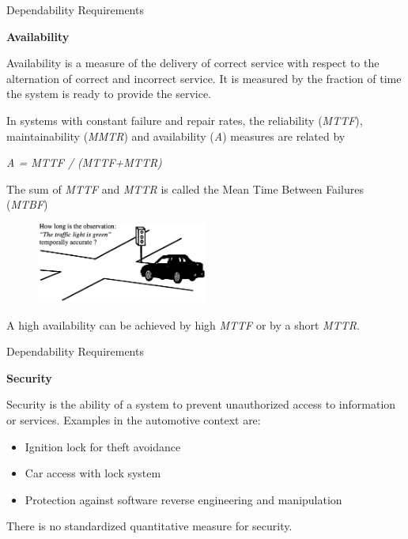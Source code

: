 \begin{frame}{Dependability Requirements}

\textbf{Availability}

Availability is a measure of the delivery of correct service with
respect to the alternation of correct and incorrect service. It is
measured by the fraction of time the system is ready to provide the
service.

In systems with constant failure and repair rates, the reliability
(\emph{MTTF}), maintainability (\emph{MMTR}) and availability (\emph{A})
measures are related by

\emph{A = MTTF / (MTTF+MTTR)}


The sum of \emph{MTTF} and \emph{MTTR} is called the Mean Time Between
Failures (\emph{MTBF})

\begin{figure}
\includegraphics[width=0.5\textwidth]{media/Fig_1_2.png}
\centering
\end{figure}
A high availability can be achieved by high \emph{MTTF} or by a short
\emph{MTTR}.

\end{frame}

\begin{frame}{Dependability Requirements}

\textbf{Security}

Security is the ability of a system to prevent unauthorized access to
information or services. Examples in the automotive context are:

\begin{itemize}
\item
  Ignition lock for theft avoidance
\item
  Car access with lock system
\item
  Protection against software reverse engineering and manipulation
\end{itemize}

There is no standardized quantitative measure for security.

\end{frame}

